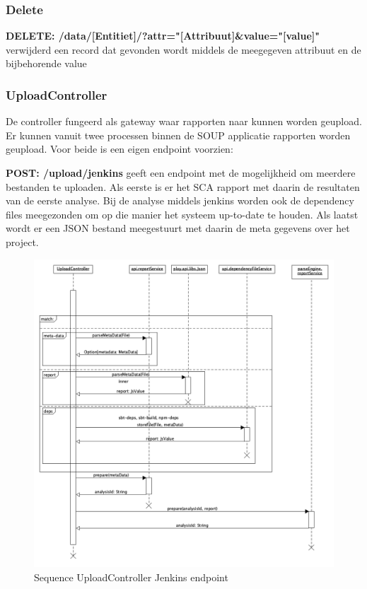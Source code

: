 \subsubsection*{Delete}
\textbf{DELETE: /data/[Entitiet]/?attr="[Attribuut]&value="[value]"} verwijderd een record dat gevonden wordt middels de meegegeven attribuut en de bijbehorende value

\subsubsection{UploadController}
De controller fungeerd als gateway waar rapporten naar kunnen worden geupload. Er kunnen vanuit twee processen binnen de SOUP applicatie rapporten worden geupload. Voor beide is een eigen endpoint voorzien:

\textbf{POST: /upload/jenkins} geeft een endpoint met de mogelijkheid om meerdere bestanden te uploaden. Als eerste is er het SCA rapport met daarin de resultaten van de eerste analyse. Bij de analyse middels jenkins worden ook de dependency files meegezonden om op die manier het systeem up-to-date te houden. Als laatst wordt er een JSON bestand meegestuurt met daarin de meta gegevens over het project.

\begin{figure}[bth]
    \myfloatalign
    \includegraphics[width=12cm]{gfx/umlet/exports/SequploadController-Jenkins}
    \caption{Sequence UploadController Jenkins endpoint}
    \label{fig:SequenceUploadReportJenkins}
\end{figure}

